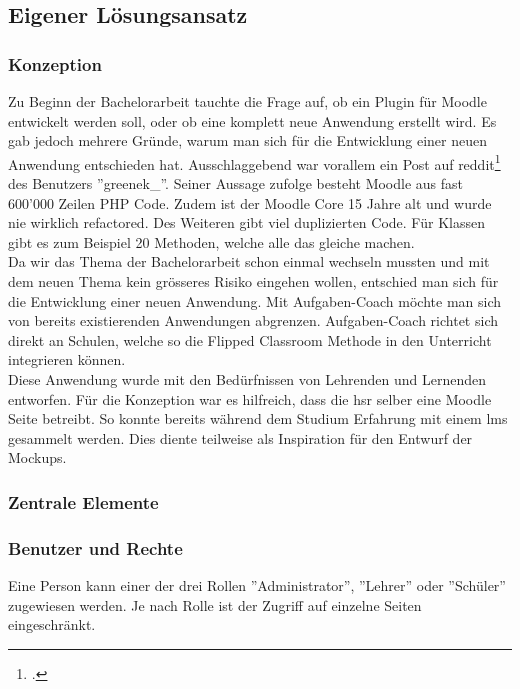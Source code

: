 \newpage

\subsection{Eigener Lösungsansatz}
\subsubsection{Konzeption}

Zu Beginn der Bachelorarbeit tauchte die Frage auf, ob ein Plugin für Moodle entwickelt werden soll, oder ob eine komplett neue Anwendung erstellt wird. Es gab jedoch mehrere Gründe, warum man sich für die Entwicklung einer neuen Anwendung entschieden hat. Ausschlaggebend war vorallem ein Post auf reddit\footcite{moodle_bericht} des Benutzers ''greenek\_''. Seiner Aussage zufolge besteht Moodle aus fast 600'000 Zeilen PHP Code. Zudem ist der Moodle Core 15 Jahre alt und wurde nie wirklich refactored. Des Weiteren gibt viel duplizierten Code. Für Klassen gibt es zum Beispiel 20 Methoden, welche alle das gleiche machen. \\

Da wir das Thema der Bachelorarbeit schon einmal wechseln mussten und mit dem neuen Thema kein grösseres Risiko eingehen wollen, entschied man sich für die Entwicklung einer neuen Anwendung. Mit Aufgaben-Coach möchte man sich von bereits existierenden Anwendungen abgrenzen. Aufgaben-Coach richtet sich direkt an Schulen, welche so die Flipped Classroom Methode in den Unterricht integrieren können. \\

Diese Anwendung wurde mit den Bedürfnissen von Lehrenden und Lernenden entworfen. Für die Konzeption war es hilfreich, dass die \gls{hsr} selber eine Moodle Seite betreibt. So konnte bereits während dem Studium Erfahrung mit einem \gls{lms} gesammelt werden. Dies diente teilweise als Inspiration für den Entwurf der Mockups.

\subsubsection{Zentrale Elemente}
\subsubsection*{Benutzer und Rechte}
Eine Person kann einer der drei Rollen ''Administrator'', ''Lehrer'' oder ''Schüler'' zugewiesen werden. Je nach Rolle ist der Zugriff auf einzelne Seiten eingeschränkt. \\

